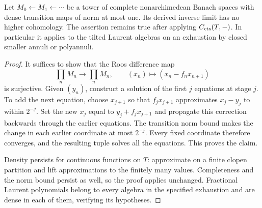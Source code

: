 \begin{lemma}\label{h3:ana:analytic-limits}
Let $M_0\leftarrow M_1\leftarrow\cdots$ be a tower of complete
nonarchimedean Banach spaces with dense transition maps of norm at
most one.  Its derived inverse limit has no higher cohomology.
The assertion remains true after applying $C_{\mathrm{cts}}(T,-)$.
In particular it applies to the tilted Laurent algebras on an
exhaustion by closed smaller annuli or polyannuli.
\end{lemma}
\begin{proof}
It suffices to show that the Roos difference map
\[
 \prod_n M_n\longrightarrow\prod_n M_n,\qquad
 (x_n)\longmapsto(x_n-f_nx_{n+1})
\]
is surjective.  Given $(y_n)$, construct a solution of the first
$j$ equations at stage $j$.  To add the next equation, choose
$x_{j+1}$ so that $f_jx_{j+1}$ approximates $x_j-y_j$ to within
$2^{-j}$.  Set the new $x_j$ equal to $y_j+f_jx_{j+1}$ and
propagate this correction backwards through the earlier equations.
The transition norm bound makes the change in each earlier
coordinate at most $2^{-j}$.  Every fixed coordinate therefore
converges, and the resulting tuple solves all the equations.
This proves the claim.

Density persists for continuous functions on $T$: approximate
on a finite clopen partition and lift approximations to the
finitely many values.  Completeness and the norm bound persist
as well, so the proof applies unchanged.  Fractional Laurent
polynomials belong to every algebra in the specified exhaustion
and are dense in each of them, verifying its hypotheses.
\end{proof}

